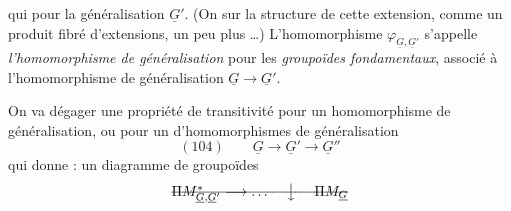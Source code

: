 \documentclass[11pt,a4paper]{article}
\begin{document}

qui   pour  la généralisation $\underline{G}'$.  (On  sur la structure de cette extension, comme un produit fibré d'extensions, un peu plus …) L'homomorphisme $\varphi_{\underline{G},\underline{G}'}$ s'appelle \emph{l'homomorphisme de généralisation} pour les \emph{groupoïdes fondamentaux}, associé à l'homomorphisme de généralisation $\underline{G} \to \underline{G}'$.

On va dégager une propriété de transitivité pour un homomorphisme de généralisation, ou  pour un  d'homomorphismes de généralisation
\[
(104)\qquad \underline{G} \longrightarrow \underline{G}' \longrightarrow \underline{G}''
\]
qui donne \uncertain{\ill{}}  : un diagramme de groupoïdes
\[
\text{\struck{$\Pi M^{*}_{\underline{G},\underline{G}'} \longrightarrow \ldots$ \quad $\big\downarrow$ \quad $\Pi M_{\underline{G}}$}}
\]
\end{document}
